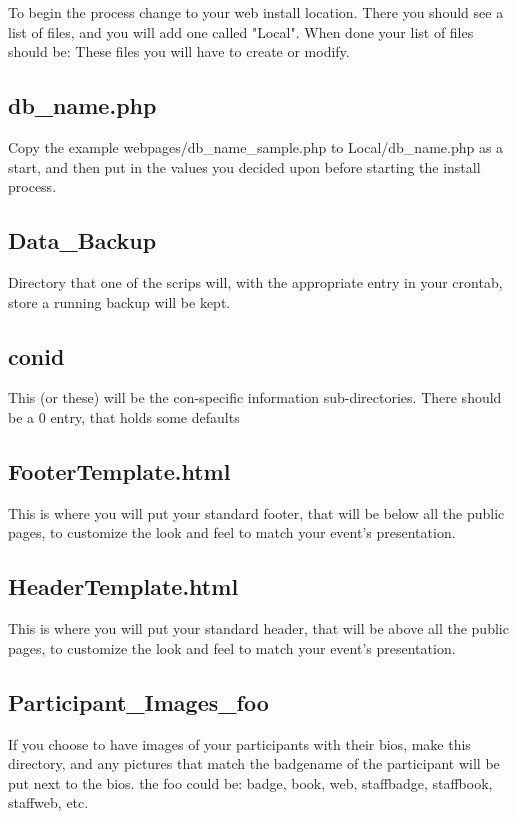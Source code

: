 \documentclass[captions=tablesignature]{scrartcl}
\begin{document}
To begin the process change to your web install location.  There you
should see a list of files, and you will add one called "Local".
When done your list of files should be:
These files you will have to create or modify.
\subsection{db\_name.php}
\label{sec-3-1}
Copy the example webpages/db\_name\_sample.php to Local/db\_name.php
as a start, and then put in the values you decided upon before
starting the install process.

\subsection{Data\_Backup}
\label{sec-3-2}
Directory that one of the scrips will, with the appropriate entry
in your crontab, store a running backup will be kept.

\subsection{conid}
\label{sec-3-3}
This (or these) will be the con-specific information
sub-directories.
There should be a 0 entry, that holds some defaults

\subsection{FooterTemplate.html}
\label{sec-3-4}
This is where you will put your standard footer, that will be
below all the public pages, to customize the look and feel to
match your event's presentation.

\subsection{HeaderTemplate.html}
\label{sec-3-5}
This is where you will put your standard header, that will be
above all the public pages, to customize the look and feel to
match your event's presentation.

\subsection{Participant\_Images\_foo}
\label{sec-3-6}
If you choose to have images of your participants with their
bios, make this directory, and any pictures that match the
badgename of the participant will be put next to the bios.
the foo could be: badge, book, web, staffbadge, staffbook,
staffweb, etc.
\end{document}
